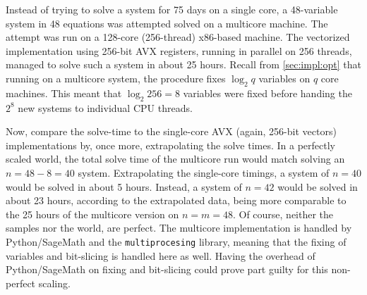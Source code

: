 Instead of trying to solve a system for 75 days on a single core, a 48-variable system in 48 equations was attempted solved on a multicore machine. The attempt was run on a 128-core (256-thread) x86-based machine. The vectorized implementation using 256-bit AVX registers, running in parallel on 256 threads, managed to solve such a system in about 25 hours. Recall from \cref{sec:impl:opt} that running on a multicore system, the procedure fixes $\log_2 q$ variables on $q$ core machines. This meant that $\log_2 256 = 8$ variables were fixed before handing the $2^8$ new systems to individual CPU threads. 

Now, compare the solve-time to the single-core AVX (again, 256-bit vectors) implementations by, once more, extrapolating the solve times. In a perfectly scaled world, the total solve time of the multicore run would match solving an $n = 48 - 8 = 40$ system. Extrapolating the single-core timings, a system of $n = 40$ would be solved in about 5 hours. Instead, a system of $n = 42$ would be solved in about 23 hours, according to the extrapolated data, being more comparable to the 25 hours of the multicore version on $n = m = 48$. Of course, neither the samples nor the world, are perfect. The multicore implementation is handled by Python/SageMath and the \texttt{multiprocesing} library, meaning that the fixing of variables and bit-slicing is handled here as well. Having the overhead of Python/SageMath on fixing and bit-slicing could prove part guilty for this non-perfect scaling. 
